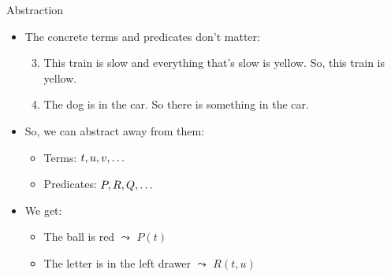 \begin{frame}{Abstraction}

	\begin{itemize}%
	\itemsep=16pt
	
		\item The concrete terms and predicates don't matter:
				\begin{enumerate}[(1')]
		\setcounter{enumii}{2}
	
		\item This train is slow and everything that's slow is yellow. So, this train is yellow.
		
		\item The dog is in the car. So there is something in the car.
	
	\end{enumerate}

	\item So, we can abstract away from them:
		
			\begin{itemize}
			
				\item Terms: $t,u,v,\mathellipsis$
				
				\item Predicates: $P,R,Q,\mathellipsis$
			
			\end{itemize}
			
	\item We get:
	
		\begin{itemize}
		
			\item The ball is red $\leadsto$ $P(t)$
			
			\item The letter is in the left drawer $\leadsto$ $R(t,u)$
		
		\end{itemize}

	
	\end{itemize}

\end{frame}

